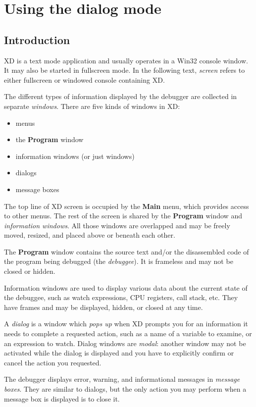 \chapter{Using the dialog mode}
\label{dialog}

\section{Introduction}
\label{dialog:intro}

XD is a text mode application and usually operates in a Win32 console window. 
It may also be started in fullscreen mode. In the following text, {\em screen} refers
to either fullscreen or windowed console containing XD.

The different types of information displayed by the debugger
are collected in separate {\em windows}. There are five
kinds of windows in XD:
\begin{itemize}
\item menus
\item the {\bf Program} window
\item information windows (or just windows)
\item dialogs
\item message boxes
\end{itemize}
The top line of XD screen is occupied by the {\bf Main} menu, which
provides access to other menus. The rest of the screen is shared by
the {\bf Program} window and {\em information windows}.
All those windows are overlapped and may be freely moved, resized, and placed
above or beneath each other.

The {\bf Program} window contains the source text and/or the disassembled
code of the program being debugged (the {\it debuggee}).
It is frameless and may not be closed or hidden.

Information windows are used to display various data about the current state
of the debuggee, such as watch expressions, CPU registers, call stack, etc.
They have frames and may be displayed, hidden, or closed at any time.

A {\em dialog} is a window which {\em pops up} when XD prompts you for an information
it needs to complete a requested action, such as a name of a variable to examine,
or an expression to watch. Dialog windows are {\em modal}: another window
may not be activated while the dialog is displayed and you have to explicitly
confirm or cancel the action you requested.

The debugger displays error, warning, and informational messages in
{\it message boxes}. They are similar to dialogs, but the only
action you may perform when a message box is displayed is to close it.

